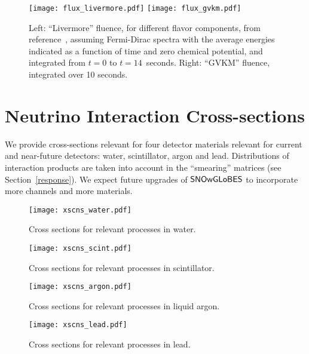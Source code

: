 \documentclass[12pt]{article}
\newcommand{\snowglobes}{\sf{SNOwGLoBES}}
\begin{document}

\begin{figure}
\texttt{[image: flux\_livermore.pdf]}
\texttt{[image: flux\_gvkm.pdf]}

\caption{Left: ``Livermore'' fluence, for different flavor components,
  from reference~\cite{Totani:1997vj}, assuming Fermi-Dirac spectra with
  the average energies indicated as a function of time and zero
  chemical potential, and integrated from $t=0$ to $t=14$~seconds.  Right: ``GVKM'' fluence, integrated over 10
  seconds.}\label{fig:fluxes}
\end{figure}


\section{Neutrino Interaction Cross-sections}

We provide cross-sections relevant for four detector materials relevant for current and near-future detectors:
water, scintillator, argon and lead.  Distributions of interaction
products are taken into account in the ``smearing'' matrices (see Section~\ref{response}).  We
expect future upgrades of $\snowglobes$ to incorporate more channels and
more materials.

\begin{figure}[htb]
  \centering\texttt{[image: xscns\_water.pdf]}
  \caption{Cross sections for relevant processes in water.}
  \label{fig:water_xscns}
\end{figure}

\begin{figure}[htb]
  \centering\texttt{[image: xscns\_scint.pdf]}
  \caption{Cross sections for relevant processes in scintillator.}
  \label{fig:scint_xscns}
\end{figure}


\begin{figure}[htb]
  \centering\texttt{[image: xscns\_argon.pdf]}
  \caption{Cross sections for relevant processes in liquid argon.}
  \label{fig:argon_xscns}
\end{figure}

\begin{figure}[htb]
  \centering\texttt{[image: xscns\_lead.pdf]}
  \caption{Cross sections for relevant processes in lead.}
  \label{fig:lead_xscns}
\end{figure}
\end{document}
